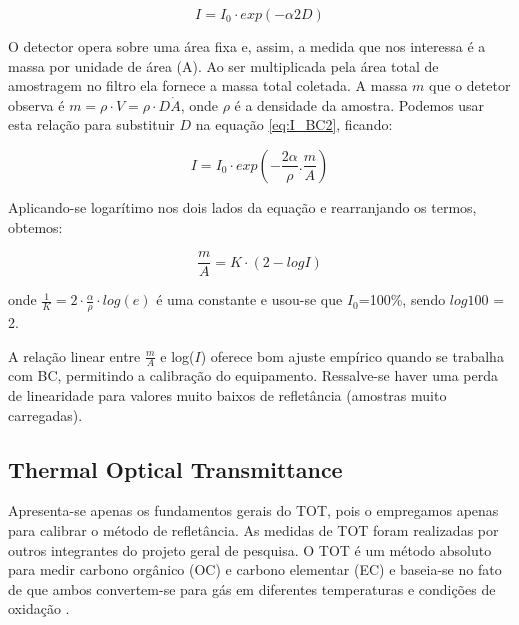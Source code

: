 \begin{equation}
  \label{eq:I_BC2}
  I = I_0 \cdot exp(-\alpha 2D)
\end{equation}

O detector opera sobre uma área fixa e, assim, a medida que nos interessa é a 
massa por unidade de área (A). Ao ser multiplicada pela área total de amostragem
no filtro ela fornece a massa total coletada. A massa $m$ que o detetor observa 
é $m = \rho \cdot V = \rho \cdot D \dot A$, onde $\rho$ é a densidade da amostra. 
Podemos usar esta relação para substituir $D$ na equação \ref{eq:I_BC2}, 
ficando:

\begin{equation}
  \label{m/a}
  I = I_0 \cdot exp \left( -\frac{2\alpha}{\rho}.\frac{m}{A} \right)
\end{equation}

Aplicando-se logarítimo nos dois lados da equação e rearranjando os termos, 
obtemos:

\begin{equation}
  \label{m/a_2}
  \frac{m}{A} = K \cdot (2-logI) 
\end{equation}

onde $\frac{1}{K} = 2 \cdot \frac{\alpha}{\rho} \cdot log(e)$
é uma constante e usou-se que $I_0$=100\%, sendo $log 100$ = 2.

A relação linear entre $\frac{m}{A}$ e log($I$) oferece bom ajuste empírico 
quando se trabalha com BC, permitindo a calibração do equipamento. 
Ressalve-se haver uma perda de linearidade para valores muito baixos de 
refletância (amostras muito carregadas).  

\subsection{Thermal Optical Transmittance}

Apresenta-se apenas os fundamentos gerais do TOT, pois o empregamos apenas para
calibrar o método de refletância. As medidas de TOT foram realizadas por outros
integrantes do projeto geral de pesquisa.
O TOT é um método absoluto para medir carbono orgânico (OC) e 
carbono elementar (EC) e baseia-se no fato de que ambos convertem-se para gás 
em diferentes temperaturas e condições de oxidação \citep{birch1998}.

